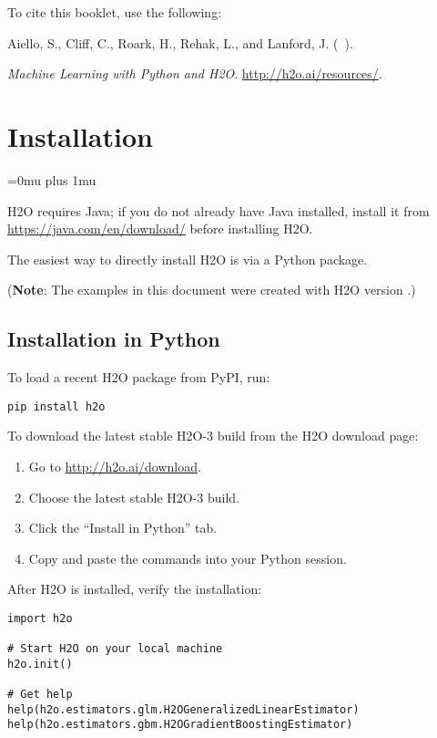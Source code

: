To cite this booklet, use the following: 

Aiello, S., Cliff, C., Roark, H., Rehak, L., and Lanford, J. (\shortmonthname\ \the\year). {\textit{Machine Learning with Python and H2O}. {\url{http://h2o.ai/resources/}}.


\section{Installation} 
\Urlmuskip=0mu plus 1mu\relax %

H2O requires Java; if you do not already have Java installed, install it from {\url{https://java.com/en/download/}} before installing H2O. 

The easiest way to directly install H2O is  via a Python package.

({\bf{Note}}: The examples in this document were created with H2O version \waterVersion.)

\subsection{Installation in Python}

To load a recent H2O package from PyPI, run:

\begin{lstlisting}[style=pythoncode]
pip install h2o
\end{lstlisting}

To download the
latest stable H2O-3 build from the H2O download page:

\begin{enumerate}
\item Go to {\url{http://h2o.ai/download}}.
\item Choose the latest stable H2O-3 build.
\item Click the ``Install in Python'' tab.
\item Copy and paste the commands into your Python session.
\end{enumerate}

After H2O is installed, verify the installation:

\begin{lstlisting}[style=pythoncode]
import h2o

# Start H2O on your local machine
h2o.init()

# Get help
help(h2o.estimators.glm.H2OGeneralizedLinearEstimator)
help(h2o.estimators.gbm.H2OGradientBoostingEstimator)


\end{lstlisting}}
